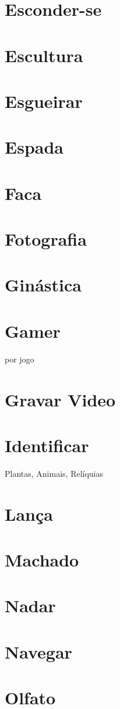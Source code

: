 \section{Esconder-se}
\section{Escultura}
\section{Esgueirar}
\section{Espada}
\section{Faca}
\section{Fotografia}
\section{Ginástica}
\section{Gamer} por jogo
\section{Gravar Video}
\section{Identificar} Plantas, Animais, Relíquias
\section{Lança}
\section{Machado}
\section{Nadar}
\section{Navegar}%
\section{Olfato}
